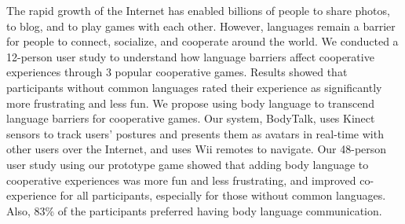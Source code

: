 
The rapid growth of the Internet has enabled billions of people to share photos, to blog, and to play games with each other. However, languages remain a barrier for people to connect, socialize, and cooperate around the world. 
We conducted a 12-person user study to understand how language barriers affect cooperative experiences through 3 popular cooperative games. Results showed that participants without common languages rated their experience as significantly more frustrating and less fun. We propose using body language to transcend language barriers for cooperative games. Our system, BodyTalk, uses Kinect sensors to track users' postures and presents them as avatars in real-time with other users over the Internet, and uses Wii remotes to navigate.  Our 48-person user study using our prototype game showed that adding body language to cooperative experiences was more fun and less frustrating, and improved co-experience for all participants, especially for those without common languages. 
Also, 83\% of the participants preferred having body language communication. 

%
